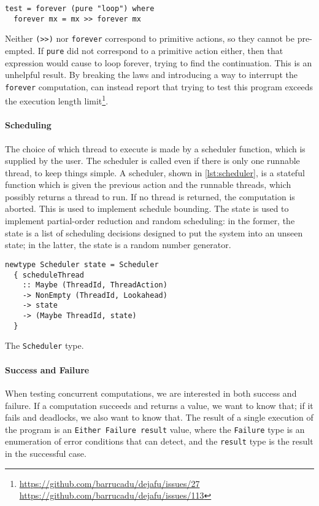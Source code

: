 \begin{verbatim}
test = forever (pure "loop") where
  forever mx = mx >> forever mx
\end{verbatim}

Neither \verb|(>>)| nor \verb|forever| correspond to primitive actions, so they
cannot be pre-empted.  If \verb|pure| did not correspond to a primitive action
either, then that expression would cause \dejafu{} to loop forever, trying to
find the continuation.  This is an unhelpful result.  By breaking the laws and
introducing a way to interrupt the \verb|forever| computation, \dejafu{} can
instead report that trying to test this program exceeds the execution length
limit\footnote{\url{https://github.com/barrucadu/dejafu/issues/27}\\\url{https://github.com/barrucadu/dejafu/issues/113}}.

\paragraph{Scheduling}
The choice of which thread to execute is made by a scheduler function, which is
supplied by the user.  The scheduler is called even if there is only one
runnable thread, to keep things simple.  A scheduler, shown in
\cref{lst:scheduler}, is a stateful function which is given the previous action
and the runnable threads, which possibly returns a thread to run.  If no thread
is returned, the computation is aborted.  This is used to implement schedule
bounding.  The state is used to implement partial-order reduction and random
scheduling: in the former, the state is a list of scheduling decisions designed
to put the system into an unseen state; in the latter, the state is a random
number generator.

\begin{listing}
  \begin{verbatim}
newtype Scheduler state = Scheduler
  { scheduleThread
    :: Maybe (ThreadId, ThreadAction)
    -> NonEmpty (ThreadId, Lookahead)
    -> state
    -> (Maybe ThreadId, state)
  }
  \end{verbatim}
  \caption{The \dejafu{} \texttt{Scheduler} type.}\label{lst:scheduler}
\end{listing}

\paragraph{Success and Failure}
When testing concurrent computations, we are interested in both
success and failure.  If a computation succeeds and returns a value,
we want to know that; if it fails and deadlocks, we also want to know
that.  The result of a single execution of the program is an
\verb|Either Failure result| value, where the \verb|Failure| type is
an enumeration of error conditions that \dejafu{} can detect, and the
\verb|result| type is the result in the successful case.

